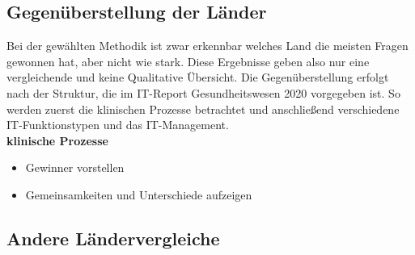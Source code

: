 \subsection{Gegenüberstellung der Länder}
Bei der gewählten Methodik ist zwar erkennbar welches Land die meisten Fragen gewonnen hat, aber nicht wie stark. Diese Ergebnisse geben also nur eine vergleichende und keine Qualitative Übersicht. Die Gegenüberstellung erfolgt nach der Struktur, die im IT-Report Gesundheitswesen 2020 vorgegeben ist. So werden zuerst die klinischen Prozesse betrachtet und anschließend verschiedene IT-Funktionstypen und das IT-Management.
	\vspace{\parheadvspace}\\
	\textbf{klinische Prozesse}\\
\begin{itemize}
	\item Gewinner vorstellen
	\item Gemeinsamkeiten und Unterschiede aufzeigen
\end{itemize}
\subsection{Andere Ländervergleiche}
